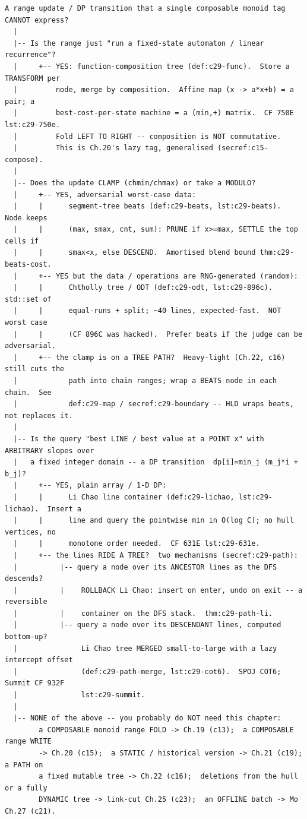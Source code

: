 \begin{lstlisting}[language={}, basicstyle=\ttfamily\small, numbers=none, frame=single]
  A range update / DP transition that a single composable monoid tag CANNOT express?
  |
  |-- Is the range just "run a fixed-state automaton / linear recurrence"?
  |     +-- YES: function-composition tree (def:c29-func).  Store a TRANSFORM per
  |         node, merge by composition.  Affine map (x -> a*x+b) = a pair; a
  |         best-cost-per-state machine = a (min,+) matrix.  CF 750E lst:c29-750e.
  |         Fold LEFT TO RIGHT -- composition is NOT commutative.
  |         This is Ch.20's lazy tag, generalised (secref:c15-compose).
  |
  |-- Does the update CLAMP (chmin/chmax) or take a MODULO?
  |     +-- YES, adversarial worst-case data:
  |     |      segment-tree beats (def:c29-beats, lst:c29-beats).  Node keeps
  |     |      (max, smax, cnt, sum): PRUNE if x>=max, SETTLE the top cells if
  |     |      smax<x, else DESCEND.  Amortised blend bound thm:c29-beats-cost.
  |     +-- YES but the data / operations are RNG-generated (random):
  |     |      Chtholly tree / ODT (def:c29-odt, lst:c29-896c).  std::set of
  |     |      equal-runs + split; ~40 lines, expected-fast.  NOT worst case
  |     |      (CF 896C was hacked).  Prefer beats if the judge can be adversarial.
  |     +-- the clamp is on a TREE PATH?  Heavy-light (Ch.22, c16) still cuts the
  |            path into chain ranges; wrap a BEATS node in each chain.  See
  |            def:c29-map / secref:c29-boundary -- HLD wraps beats, not replaces it.
  |
  |-- Is the query "best LINE / best value at a POINT x" with ARBITRARY slopes over
  |   a fixed integer domain -- a DP transition  dp[i]=min_j (m_j*i + b_j)?
  |     +-- YES, plain array / 1-D DP:
  |     |      Li Chao line container (def:c29-lichao, lst:c29-lichao).  Insert a
  |     |      line and query the pointwise min in O(log C); no hull vertices, no
  |     |      monotone order needed.  CF 631E lst:c29-631e.
  |     +-- the lines RIDE A TREE?  two mechanisms (secref:c29-path):
  |          |-- query a node over its ANCESTOR lines as the DFS descends?
  |          |    ROLLBACK Li Chao: insert on enter, undo on exit -- a reversible
  |          |    container on the DFS stack.  thm:c29-path-li.
  |          |-- query a node over its DESCENDANT lines, computed bottom-up?
  |               Li Chao tree MERGED small-to-large with a lazy intercept offset
  |               (def:c29-path-merge, lst:c29-cot6).  SPOJ COT6; Summit CF 932F
  |               lst:c29-summit.
  |
  |-- NONE of the above -- you probably do NOT need this chapter:
        a COMPOSABLE monoid range FOLD -> Ch.19 (c13);  a COMPOSABLE range WRITE
        -> Ch.20 (c15);  a STATIC / historical version -> Ch.21 (c19);  a PATH on
        a fixed mutable tree -> Ch.22 (c16);  deletions from the hull or a fully
        DYNAMIC tree -> link-cut Ch.25 (c23);  an OFFLINE batch -> Mo Ch.27 (c21).
\end{lstlisting}

